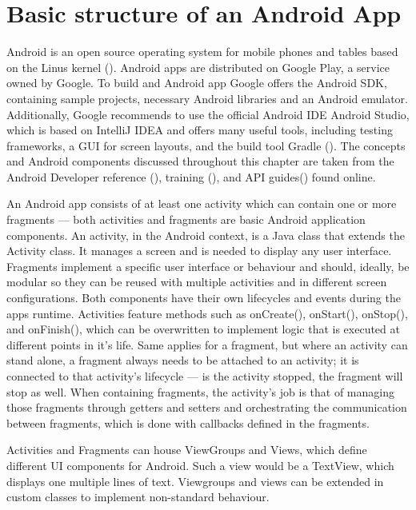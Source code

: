 \section{Basic structure of an Android App}
Android is an open source operating system for mobile phones and tables based on the Linus kernel (\cite{androiddef}). Android apps are distributed on Google Play, a service owned by Google. To build and Android app Google offers the Android \gls{SDK}, containing sample projects, necessary Android libraries and an Android emulator. Additionally, Google recommends to use the official Android \gls{IDE} Android Studio, which is based on IntelliJ IDEA and offers many useful tools, including testing frameworks, a \gls{GUI} for screen layouts, and the build tool Gradle (\cite{androidstudio}). The concepts and Android components discussed throughout this chapter are taken from the Android Developer reference (\cite{androidreference}), training (\cite{androidtraining}), and \gls{API} guides(\cite{androidguides}) found online.

An Android app consists of  at least one activity which can contain one or more fragments --- both activities and fragments are basic Android application components. An activity, in the Android context, is a Java class that extends the Activity class. It manages a screen and is needed to display any user interface. Fragments implement a specific user interface or behaviour and should, ideally, be modular so they can be reused with multiple activities and in different screen configurations. Both components have their own lifecycles and events during the apps runtime. Activities feature methods such as onCreate(), onStart(), onStop(), and onFinish(), which can be overwritten to implement logic that is executed at different points in it’s life. Same applies for a fragment, but where an activity can stand alone, a fragment always needs to be attached to an activity; it is connected to that activity's lifecycle --- is the activity stopped, the fragment will stop as well.
When containing fragments, the activity’s job is that of managing those fragments through getters and setters and orchestrating the communication between fragments, which is done with callbacks defined in the fragments.

Activities and Fragments can house ViewGroups and Views, which define different UI components for Android. Such a view would be a TextView, which displays one multiple lines of text. Viewgroups and views can be extended in custom classes to implement non-standard behaviour.

